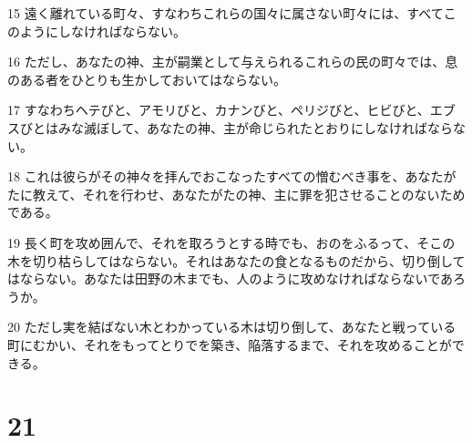\par 15 遠く離れている町々、すなわちこれらの国々に属さない町々には、すべてこのようにしなければならない。
\par 16 ただし、あなたの神、主が嗣業として与えられるこれらの民の町々では、息のある者をひとりも生かしておいてはならない。
\par 17 すなわちヘテびと、アモリびと、カナンびと、ペリジびと、ヒビびと、エブスびとはみな滅ぼして、あなたの神、主が命じられたとおりにしなければならない。
\par 18 これは彼らがその神々を拝んでおこなったすべての憎むべき事を、あなたがたに教えて、それを行わせ、あなたがたの神、主に罪を犯させることのないためである。
\par 19 長く町を攻め囲んで、それを取ろうとする時でも、おのをふるって、そこの木を切り枯らしてはならない。それはあなたの食となるものだから、切り倒してはならない。あなたは田野の木までも、人のように攻めなければならないであろうか。
\par 20 ただし実を結ばない木とわかっている木は切り倒して、あなたと戦っている町にむかい、それをもってとりでを築き、陥落するまで、それを攻めることができる。

\chapter{21}

